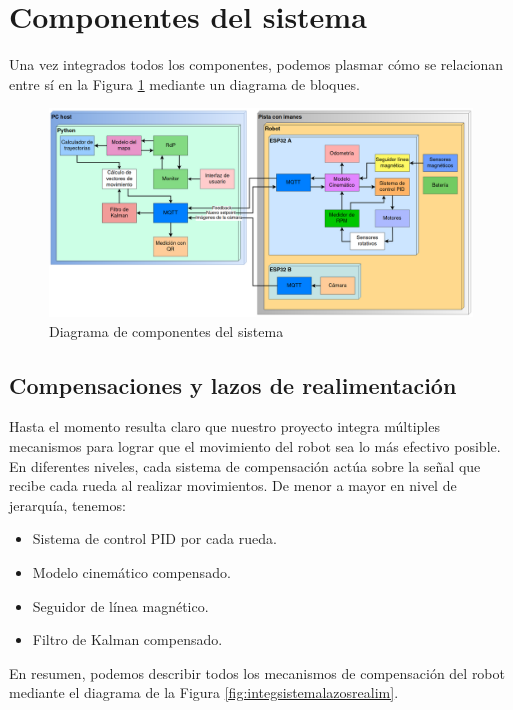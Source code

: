 \section{Componentes del sistema}

Una vez integrados todos los componentes, podemos plasmar cómo se relacionan entre sí en la Figura \ref{fig:integsistemadiagcomp} mediante un diagrama de bloques.

\begin{figure}[H]
    \centering
    \hspace*{-2.0cm}
    \includegraphics[width=1.25\linewidth]{images/integ_sistema_general.png}
    \caption{Diagrama de componentes del sistema}
    \label{fig:integsistemadiagcomp}
\end{figure}


\subsection{Compensaciones y lazos de realimentación}

Hasta el momento resulta claro que nuestro proyecto integra múltiples mecanismos para lograr que el movimiento del robot sea lo más efectivo posible. En diferentes niveles, cada sistema de compensación actúa sobre la señal que recibe cada rueda al realizar movimientos. De menor a mayor en nivel de jerarquía, tenemos:

\begin{itemize}
    \item Sistema de control PID por cada rueda.
    \item Modelo cinemático compensado.
    \item Seguidor de línea magnético.
    \item Filtro de Kalman compensado.
\end{itemize}

En resumen, podemos describir todos los mecanismos de compensación del robot mediante el diagrama de la Figura \ref{fig:integsistemalazosrealim}.


